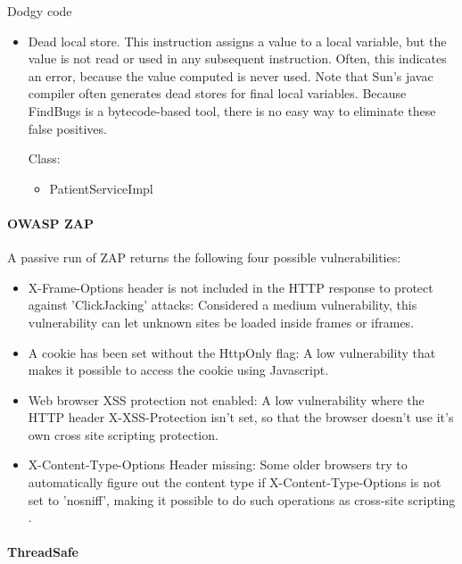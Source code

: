 \documentclass{report} %
\begin{document}
Dodgy code
  \begin{itemize}
    \item Dead local store. This instruction assigns a value to a local variable, but the
      value is not read or used in any subsequent instruction. Often, this
      indicates an error, because the value computed is never used.
      Note that Sun's javac compiler often generates dead stores for final
      local variables. Because FindBugs is a bytecode-based tool, there is
      no easy way to eliminate these false positives.

      Class:
      \begin{itemize}

        \item PatientServiceImpl
      \end{itemize}
  \end{itemize}
\paragraph{OWASP ZAP}

A passive run of ZAP returns the following four possible vulnerabilities:

\begin{itemize}
 \item X-Frame-Options header is not included in the HTTP response to protect against
  'ClickJacking' attacks: Considered a medium vulnerability, this
  vulnerability can let unknown sites be loaded inside frames or iframes.
 \item A cookie has been set without the HttpOnly flag: A low vulnerability that
   makes it possible to access the cookie using Javascript. 
 \item Web browser XSS protection not enabled: A low vulnerability where the
   HTTP header X-XSS-Protection isn't set, so that the browser doesn't use it's
   own cross site scripting protection.
 \item X-Content-Type-Options Header missing: Some older browsers try to
   automatically figure out the content type if X-Content-Type-Options is not
   set to 'nosniff', making it possible to do such operations as cross-site
   scripting \autocite[]{XFrame}.
\end{itemize}

\paragraph{ThreadSafe} %
\end{document}
